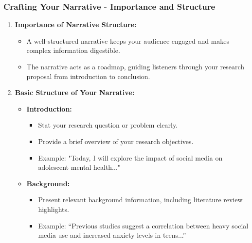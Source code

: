 \documentclass[aspectratio=169]{beamer}
\begin{document}
\begin{frame}[fragile]
    \frametitle{Crafting Your Narrative - Importance and Structure}
    \begin{enumerate}
        \item \textbf{Importance of Narrative Structure:}
        \begin{itemize}
            \item A well-structured narrative keeps your audience engaged and makes complex information digestible.
            \item The narrative acts as a roadmap, guiding listeners through your research proposal from introduction to conclusion.
        \end{itemize}
        
        \item \textbf{Basic Structure of Your Narrative:}
        \begin{itemize}
            \item \textbf{Introduction:}
            \begin{itemize}
                \item Stat your research question or problem clearly.
                \item Provide a brief overview of your research objectives.
                \item Example: "Today, I will explore the impact of social media on adolescent mental health..."
            \end{itemize}
            \item \textbf{Background:}
            \begin{itemize}
                \item Present relevant background information, including literature review highlights.
                \item Example: “Previous studies suggest a correlation between heavy social media use and increased anxiety levels in teens...”
            \end{itemize}
        \end{itemize}
    \end{enumerate}
\end{frame}
\end{document}
